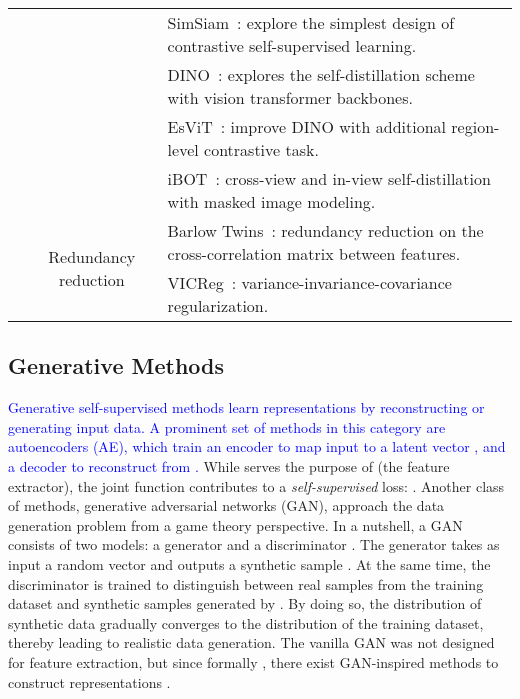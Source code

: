 \documentclass[lettersize,journal]{IEEEtran}
\begin{document}
\begin{table*}
\begin{tabular}{|c|c|l|}
                                                  &                                         & SimSiam~\cite{chen2021exploring}: explore the simplest design of contrastive self-supervised learning.            \\
                                                  &                                         & DINO~\cite{caron2021emerging}: explores the self-distillation scheme with vision transformer backbones.           \\
                                                  &                                         & EsViT~\cite{li2021efficient}: improve DINO with additional region-level contrastive task.                         \\
                                                  &                                         & iBOT~\cite{zhou2021ibot}: cross-view and in-view self-distillation with masked image modeling.                      \\ \cline{2-3} 
                                                  & \multirow{2}{*}{Redundancy reduction}   & Barlow Twins~\cite{zbontar2021barlow}: redundancy reduction on the cross-correlation matrix between features.      \\
                                                  &                                         & VICReg~\cite{bardes2021vicreg}: variance-invariance-covariance regularization.                                    \\ \hline
\end{tabular}

\label{tab:ssl}
\end{table*}


\subsection{Generative Methods}
\label{sec:GenerativeMethods}

\textcolor{blue}{Generative self-supervised methods learn representations by reconstructing or generating input data. A prominent set of methods in this category are autoencoders (AE), which train an encoder  to map input  to a latent vector , and a decoder  to reconstruct  from .} While  serves the purpose of  (the feature extractor), the joint function  contributes to a \textit{self-supervised} loss: .  Another class of methods, generative adversarial networks (GAN), approach the data generation problem from a game theory perspective. In a nutshell, a GAN consists of two models: a generator  and a discriminator . The generator takes as input a random vector  and outputs a synthetic sample . At the same time, the discriminator is trained to distinguish between real samples  from the training dataset and synthetic samples generated by . By doing so, the distribution  of synthetic data gradually converges to the distribution  of the training dataset, thereby leading to realistic data generation. The vanilla GAN was not designed for feature extraction, but since formally , there exist GAN-inspired methods to construct representations .
\end{document}
